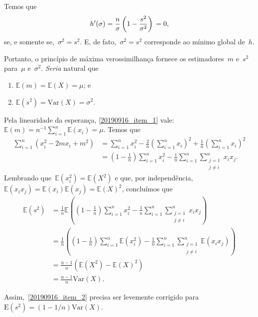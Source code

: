   Temos que
  $$h'(\sigma)
     = \frac{n}{\sigma} \left(1-\frac{s^2}{\sigma^2}\right) \\
     =0,$$
  se, e somente se,~$\sigma^2 = s^2$.
  E, de fato,~$\sigma^2 = s^2$ corresponde ao mínimo global de~$h$.
  
  Portanto, o princípio de máxima verossimilhança fornece os
  estimadores~$m$ e~$s^2$ para~$\mu$ e~$\sigma^2$.
  \emph{Seria} natural que
  \begin{enumerate}
   \item $\mathbb{E}(m) = \mathbb{E}(X) = \mu$; e
   \label{20190916_item_1}
   \item $\mathbb{E}(s^2) = \mathrm{Var}(X) = \sigma^2$.
   \label{20190916_item_2}
  \end{enumerate}
  
  Pela linearidade da esperança, \ref{20190916_item_1} vale:
  $\mathbb{E}(m)=n^{-1}\sum_{i=1}^{n}\mathbb{E}(x_i)=\mu$.
  Temos que
  $$\begin{aligned}
     \sum_{i=1}^{n}(x_i^2 -2mx_i + m^2)
     &= \sum_{i=1}^{n}x_i^2
     -\frac{2}{n}\left(\sum_{i=1}^{n}x_i\right)^2
     +\frac{1}{n}\left(\sum_{i=1}^{n}x_i\right)^2 \\
     &= \left(1-\frac{1}{n}\right)\sum_{i=1}^{n}x_i^2
     -\frac{1}{n}\sum_{i=1}^{n}
     \sum_{\substack{j=1 \\ j\neq i}}^{n}x_ix_j.
    \end{aligned}$$
  Lembrando que~$\mathbb{E}(x_i^2)=\mathbb{E}(X^2)$ e que,
  por independência,~$\mathbb{E}(x_ix_j)
  =\mathbb{E}(x_i)\mathbb{E}(x_j)=\mathbb{E}(X)^2$, concluímos que
  $$\begin{aligned}
     \mathbb{E}(s^2) &= \frac{1}{n}\mathbb{E}\left(
     \left(1-\frac{1}{n}\right)\sum_{i=1}^{n}x_i^2
     -\frac{1}{n}\sum_{i=1}^{n}
     \sum_{\substack{j=1 \\ j\neq i}}^{n}x_ix_j
     \right) \\
     &= \frac{1}{n}\left(
     \left(1-\frac{1}{n}\right)\sum_{i=1}^{n}\mathbb{E}(x_i^2)
     -\frac{1}{n}\sum_{i=1}^{n}
     \sum_{\substack{j=1 \\ j\neq i}}^{n}\mathbb{E}(x_ix_j)
     \right) \\
     &= \frac{n-1}{n}\left(\mathbb{E}(X^2)-\mathbb{E}(X)^2\right) \\
     &= \frac{n-1}{n}\mathrm{Var}(X).
    \end{aligned}$$
    
  Assim,~\ref{20190916_item_2} precisa ser levemente corrigido
  para~$\mathrm{E}(s^2)=(1-1/n)\mathrm{Var}(X)$.
  
